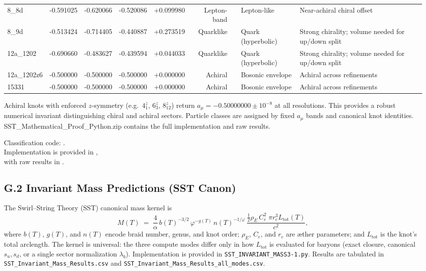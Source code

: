 \documentclass[smallextended]{svjour3}       %
\newcommand{\rhoE}{\rho_{\!E}}      %
\begin{document}
\begin{longtable}{lrrrrrllp{6.8cm}}
    8\_8d & -0.591025 & -0.620066 & -0.520086 & +0.099980 & Lepton-band &  & Lepton-like & Near-achiral chiral offset \\
    8\_9d & -0.513424 & -0.714405 & -0.440887 & +0.273519 & Quarklike &  & Quark (hyperbolic) & Strong chirality; volume needed for up/down split \\
    12a\_1202 & -0.690660 & -0.483627 & -0.439594 & +0.044033 & Quarklike &  & Quark (hyperbolic) & Strong chirality; volume needed for up/down split \\
    12a\_1202z6 & -0.500000 & -0.500000 & -0.500000 & +0.000000 & Achiral &  & Bosonic envelope & Achiral across refinements \\
    15331 & -0.500000 & -0.500000 & -0.500000 & +0.000000 & Achiral &  & Bosonic envelope & Achiral across refinements \\
    \end{longtable}


    Achiral knots with enforced $z$-symmetry (e.g.\ $4_1^z$, $6_3^z$, $8_{12}^z$) return $a_\mu=-0.50000000\pm 10^{-8}$ at all resolutions.
    This provides a robust numerical invariant distinguishing chiral and achiral sectors.
    Particle classes are assigned by fixed $a_\mu$ bands and canonical knot identities.
    SST_Mathematical_Proof_Python.zip contains the full implementation and raw results.
    \begin{flushleft}\small
    Classification code: .\\
    Implementation is provided in , \\
    with raw results in .
    \end{flushleft}

    \subsection*{G.2 Invariant Mass Predictions (SST Canon)}

    The Swirl–String Theory (SST) canonical mass kernel is
    \[
        M(T) \;=\;
        \frac{4}{\alpha}\, b(T)^{-3/2}\, \varphi^{-g(T)}\, n(T)^{-1/\varphi}
        \,
        \frac{\tfrac12 \rhoE\,C_e^2 \;\pi r_c^3 L_{\text{tot}}(T)}{c^2},
    \]
    where $b(T)$, $g(T)$, and $n(T)$ encode braid number, genus, and knot order; $\rhoE$, $C_e$, and $r_c$ are æther parameters; and $L_{\text{tot}}$ is the knot’s total arclength.
    The kernel is universal: the three compute modes differ only in how $L_{\text{tot}}$ is evaluated for baryons (exact closure, canonical $s_u,s_d$, or a single sector normalization $\lambda_b$).
    Implementation is provided in {\tt SST\_INVARIANT\_MASS3-1.py}.
    Results are tabulated in {\tt SST\_Invariant\_Mass\_Results.csv} and {\tt SST\_Invariant\_Mass\_Results\_all\_modes.csv}.
\end{document}
